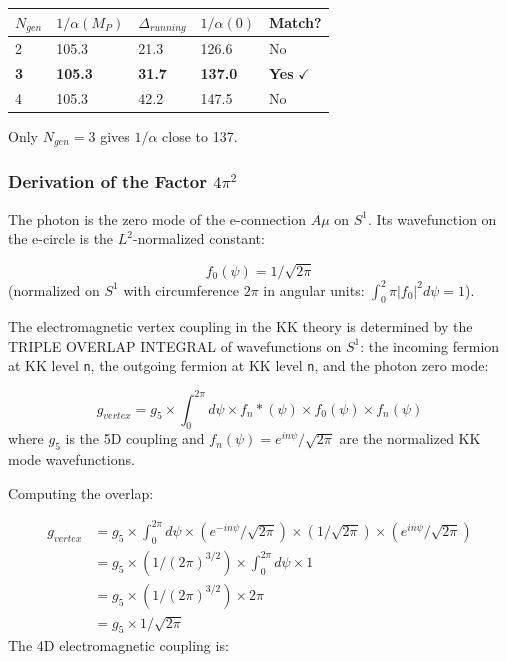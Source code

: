 \documentclass[aps,prd,preprint,superscriptaddress,longbibliography,floatfix]{revtex4-2}
\theoremstyle{remark}
\begin{document}
\begin{table}[H]
\begin{ruledtabular}
\begin{tabular}{p{3.0cm}p{3.0cm}p{3.0cm}p{3.0cm}p{3.0cm}}
$N_{gen}$ & $1/\alpha(M_P)$ & $\Delta_{running}$ & $1/\alpha(0)$ & Match? \\
\hline
2 & 105.3 & 21.3 & 126.6 & No \\
\textbf{3} & \textbf{105.3} & \textbf{31.7} & \textbf{137.0} & \textbf{Yes} $\checkmark$ \\
4 & 105.3 & 42.2 & 147.5 & No \\
\end{tabular}
\end{ruledtabular}
\end{table}

Only $N_{gen} = 3$ gives $1/\alpha$ close to 137.


\subsubsection{Derivation of the Factor $4\pi^{2}$}

The photon is the zero mode of the e-connection $A\mu$ on $S^{1}$. Its wavefunction on the e-circle is the $L^{2}$-normalized constant:


\begin{equation}
    f_{0}(\psi) = 1/\sqrt{2\pi}
\end{equation}
(normalized on $S^{1}$ with circumference $2\pi$ in angular units: $\int_{0}^{2}\pi |f_{0}|^{2} d\psi = 1$).

The electromagnetic vertex coupling in the KK theory is determined by the TRIPLE OVERLAP INTEGRAL of wavefunctions on $S^{1}$: the incoming fermion at KK level \texttt{n}, the outgoing fermion at KK level \texttt{n}, and the photon zero mode:


\begin{equation}
    g_{vertex} = g_{5} \times \int_0^{2\pi} d\psi \times f_n*(\psi) \times f_{0}(\psi) \times f_n(\psi)
\end{equation}
where $g_{5}$ is the 5D coupling and $f_n(\psi) = e^{in\psi}/\sqrt{2\pi}$ are the normalized KK mode wavefunctions.

Computing the overlap:


\begin{align}
    g_{vertex} &= g_{5} \times \int_0^{2\pi} d\psi \times (e^{-in\psi}/\sqrt{2\pi}) \times (1/\sqrt{2\pi}) \times (e^{in\psi}/\sqrt{2\pi}) \\
    & = g_{5} \times (1/(2\pi)^{3/2}) \times \int_0^{2\pi} d\psi \times 1 \\
    & = g_{5} \times (1/(2\pi)^{3/2}) \times 2\pi \\
    & = g_{5} \times 1/\sqrt{2\pi}
\end{align}
The 4D electromagnetic coupling is:
\end{document}
